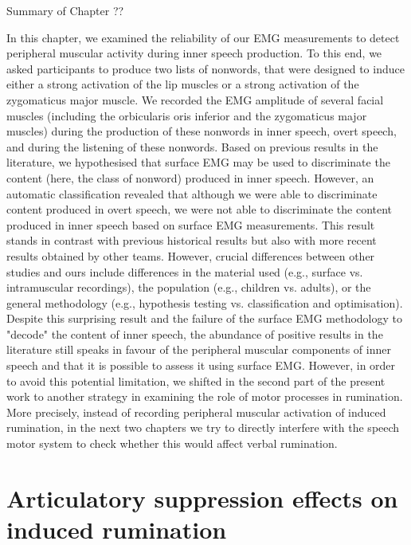 \documentclass[a4paper,12pt,twoside,onecolumn,openright,final,oldfontcommands]{memoir}
\newcommand\getcurrentref[1]{
 \ifnumequal{\value{#1}}{0}
  {??}
  {\the\value{#1}}
}
\begin{document}
\begin{vplace}[1]

\begin{summary}{Summary of Chapter\getcurrentref{chapter}}

In this chapter, we examined the reliability of our EMG measurements to detect peripheral muscular activity during inner speech production. To this end, we asked participants to produce two lists of nonwords, that were designed to induce either a strong activation of the lip muscles or a strong activation of the zygomaticus major muscle. We recorded the EMG amplitude of several facial muscles (including the orbicularis oris inferior and the zygomaticus major muscles) during the production of these nonwords in inner speech, overt speech, and during the listening of these nonwords. Based on previous results in the literature, we hypothesised that surface EMG may be used to discriminate the content (here, the class of nonword) produced in inner speech. However, an automatic classification revealed that although we were able to discriminate content produced in overt speech, we were not able to discriminate the content produced in inner speech based on surface EMG measurements. This result stands in contrast with previous historical results but also with more recent results obtained by other teams. However, crucial differences between other studies and ours include differences in the material used (e.g., surface vs. intramuscular recordings), the population (e.g., children vs. adults), or the general methodology (e.g., hypothesis testing vs. classification and optimisation). Despite this surprising result and the failure of the surface EMG methodology to "decode" the content of inner speech, the abundance of positive results in the literature still speaks in favour of the peripheral muscular components of inner speech and that it is possible to assess it using surface EMG. However, in order to avoid this potential limitation, we shifted in the second part of the present work to another strategy in examining the role of motor processes in rumination. More precisely, instead of recording peripheral muscular activation of induced rumination, in the next two chapters we try to directly interfere with the speech motor system to check whether this would affect verbal rumination.

\end{summary}

\end{vplace}

\hypertarget{chap6}{%
\chapter{Articulatory suppression effects on induced rumination}\label{chap6}}
\end{document}
